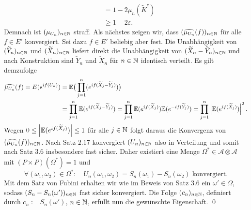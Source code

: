 \begin{proof*}
\begin{align*}
                                                              &= 1 - 2\mu_n(\tilde{K}^c) \\\
                                                              &\geq 1 - 2 \varepsilon.                                              
    \end{align*}
    Demnach ist $(\mu_{U_n})_{n \in \mathbb{N}}$ straff. 
    Als nächstes zeigen wir, dass $(\widehat{\mu_{U_n}}(f))_{n \in \mathbb{N}}$ für alle $f \in E'$ konvergiert. Sei dazu $f \in E'$ beliebig aber fest. 
    Die Unabhängigkeit von $(\widetilde{Y}_n)_{n \in \mathbb{N}}$ und $(\widetilde{X}_n)_{n \in \mathbb{N}}$ liefert direkt die Unabhängigkeit von $(\widetilde{X}_n - \widetilde{Y}_n)_{n \in \mathbb{N}}$
    und nach Konstruktion sind $\tilde{Y}_n$ und $\tilde{X}_n$ für $n \in \mathbb{N}$ identisch verteilt. Es gilt demzufolge  
    \begin{align*}
        \widehat{\mu_{U_n}}(f) = E(e^{if(U_n)}) &= \mathbb{E}\big(\prod_{j=1}^n(e^{if(\widetilde{X}_j-\widetilde{Y}_j)})\big) \\\
                                                &= \prod_{j=1}^n \mathbb{E}(e^{if(\widetilde{X}_j-\widetilde{Y}_j)})
                                                 = \prod_{j=1}^n \mathbb{E}(e^{if(\widetilde{X}_j)})\mathbb{E}(e^{-if(\widetilde{Y}_j)})
                                                 = \prod_{j=1}^n \left| \mathbb{E}(e^{if(\widetilde{X}_j)}) \right|^2.
    \end{align*}
    Wegen $0 \leq \left| \mathbb{E}(e^{if(\widetilde{X}_j)}) \right| \leq 1$ für alle $j \in \mathbb{N}$ folgt daraus die Konvergenz von $(\widehat{\mu_{U_n}}(f))_{n \in \mathbb{N}}$. 
    Nach Satz $2.17$ konvergiert $(U_n)_{n \in \mathbb{N}}$ also in Verteilung und somit nach Satz $3.6$ insbesondere fast sicher. 
    Daher existiert eine Menge $\Omega^* \in \mathcal{A} \otimes \mathcal{A}$ mit $(P\times P)(\Omega^*) = 1$ und 
    $$
        \forall (\omega_1, \omega_2) \in \Omega^*: \quad U_n(\omega_1, \omega_2) = S_n(\omega_1) - S_n(\omega_2) \text{ konvergiert.}
    $$
    Mit dem Satz von Fubini erhalten wir wie im Beweis von Satz $3.6$ ein $\omega' \in \Omega$, sodass $(S_n - S_n(\omega'))_{n \in \mathbb{N}}$ fast sicher konvergiert. 
    Die Folge $(c_n)_{n \in \mathbb{N}}$, definiert durch $c_n := S_n(\omega')$, $n \in \mathbb{N}$, erfüllt nun die gewünschte Eigenschaft. \qed

\end{proof*}

